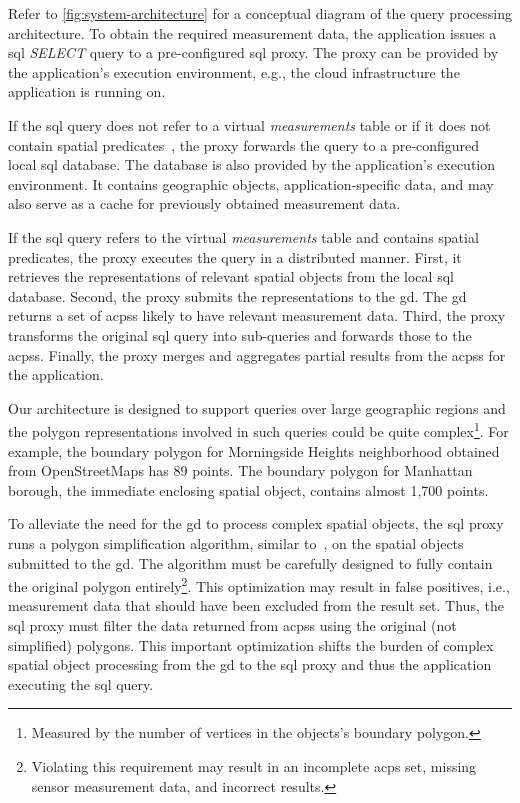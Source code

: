 \documentclass[conference,10pt]{IEEEtran}
\begin{document}
Refer to \cref{fig:system-architecture} for a conceptual diagram of the query processing architecture. To obtain the required measurement data, the application issues a \gls{sql} \textit{SELECT} query to a pre-configured \gls{sql} proxy. The proxy can be provided by the application's execution environment, e.g., the cloud infrastructure the application is running on.

If the \gls{sql} query does not refer to a virtual \textit{measurements} table or if it does not contain spatial predicates~\cite{sql-spatial,simple-feature-access}, the proxy forwards the query to a pre-configured local \gls{sql} database. The database is also provided by the application's execution environment. It contains geographic objects, application-specific data, and may also serve as a cache for previously obtained measurement data.

If the \gls{sql} query refers to the virtual \textit{measurements} table and contains spatial predicates, the proxy executes the query in a distributed manner. First, it retrieves the representations of relevant spatial objects from the local \gls{sql} database. Second, the proxy submits the representations to the \gls{gd}. The \gls{gd} returns a set of \glspl{acps} likely to have relevant measurement data. Third, the proxy transforms the original \gls{sql} query into sub-queries and forwards those to the \glspl{acps}. Finally, the proxy merges and aggregates partial results from the \glspl{acps} for the application.

Our architecture is designed to support queries over large geographic regions and the polygon representations involved in such queries could be quite complex\footnote{Measured by the number of vertices in the objects's boundary polygon.}. For example, the boundary polygon for Morningside Heights neighborhood obtained from OpenStreetMaps has 89 points. The boundary polygon for Manhattan borough, the immediate enclosing spatial object, contains almost 1,700 points.

To alleviate the need for the \gls{gd} to process complex spatial objects, the \gls{sql} proxy runs a polygon simplification algorithm, similar to~\cite{song2011polygon}, on the spatial objects submitted to the \gls{gd}. The algorithm must be carefully designed to fully contain the original polygon entirely\footnote{Violating this requirement may result in an incomplete \gls{acps} set, missing sensor measurement data, and incorrect results.}. This optimization may result in false positives, i.e., measurement data that should have been excluded from the result set. Thus, the \gls{sql} proxy must filter the data returned from \glspl{acps} using the original (not simplified) polygons. This important optimization shifts the burden of complex spatial object processing from the \gls{gd} to the \gls{sql} proxy and thus the application executing the \gls{sql} query.
\end{document}
